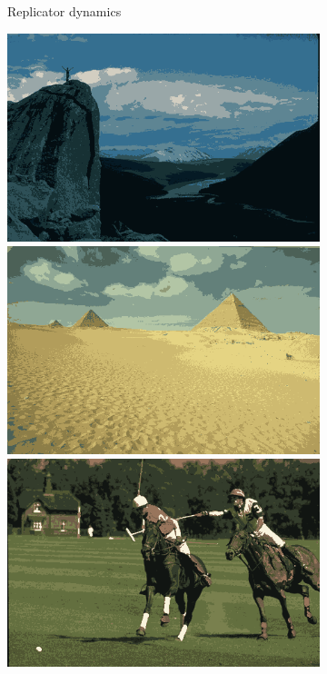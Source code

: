 \documentclass{beamer}
\begin{document}
\begin{frame}
\begin{figure}
\begin{subfigure}[b]{0.25\textwidth}
            \caption{Replicator dynamics}
        \end{subfigure}
        \hfill
        \begin{subfigure}[b]{0.25\textwidth}
            \centering
            \includegraphics[width=\textwidth]{../figures/methods/inimdyn/14037_avg.png}
            \includegraphics[width=\textwidth]{../figures/methods/inimdyn/260058_avg.png}
            \includegraphics[width=\textwidth]{../figures/methods/inimdyn/361010_avg.png}

\end{subfigure}
\end{figure}
\end{frame}
\end{document}
